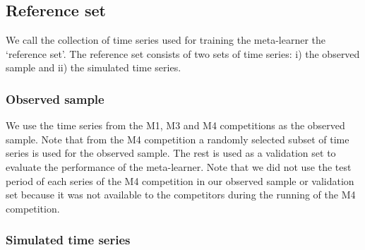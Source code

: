 \documentclass[11pt,a4paper,]{article}
\begin{document}
\hypertarget{reference-set}{%
\subsection{Reference set}\label{reference-set}}

We call the collection of time series used for training the meta-learner the `reference set'. The reference set consists of two sets of time series: i) the observed sample and ii) the simulated time series.

\hypertarget{observed-sample}{%
\subsubsection{Observed sample}\label{observed-sample}}

We use the time series from the M1, M3 and M4 competitions as the observed sample. Note that from the M4 competition a randomly selected subset of time series is used for the observed sample. The rest is used as a validation set to evaluate the performance of the meta-learner. Note that we did not use the test period of each series of the M4 competition in our observed sample or validation set because it was not available to the competitors during the running of the M4 competition.

\hypertarget{simulated-time-series}{%
\subsubsection{Simulated time series}\label{simulated-time-series}}
\end{document}
